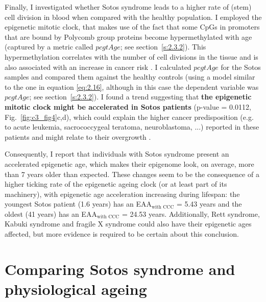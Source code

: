 \bigskip

Finally, I investigated whether Sotos syndrome leads to a higher rate of (stem) cell division in blood when compared with the healthy population. I employed the epigenetic mitotic clock, that makes use of the fact that some CpGs in promoters that are bound by Polycomb group proteins become hypermethylated with age (captured by a metric called $pcgtAge$; see section~\ref{s:2.3.2}). This hypermethylation correlates with the number of cell divisions in the tissue and is also associated with an increase in cancer risk \citep{Yang2016}. I calculated $pcgtAge$ for the Sotos samples and compared them against the healthy controls (using a model similar to the one in equation \ref{eq:2.16}, although in this case the dependent variable was $pcgtAge$; see section~\ref{s:2.3.2}). I found a trend suggesting that \textbf{the epigenetic mitotic clock might be accelerated in Sotos patients} (p-value = 0.0112, Fig.~\ref{fig:c3_fig4}c,d), which could explain the higher cancer predisposition (e.g. to acute leukemia, sacrococcygeal teratoma, neuroblastoma, ...) reported in these patients and might relate to their overgrowth \citep{Leventopoulos2009}.

\bigskip

Consequently, I report that individuals with Sotos syndrome present an accelerated epigenetic age, which makes their epigenome look, on average, more than 7 years older than expected. These changes seem to be the consequence of a higher ticking rate of the epigenetic ageing clock (or at least part of its machinery), with epigenetic age acceleration increasing during lifespan: the youngest Sotos patient (1.6 years) has an EAA$_{\text{with CCC}}$ = 5.43 years and the oldest (41 years) has an EAA$_{\text{with CCC}}$ = 24.53 years. Additionally, Rett syndrome, Kabuki syndrome and fragile X syndrome could also have their epigenetic ages affected, but more evidence is required to be certain about this conclusion.


\section{Comparing Sotos syndrome and physiological ageing}

\smallskip

